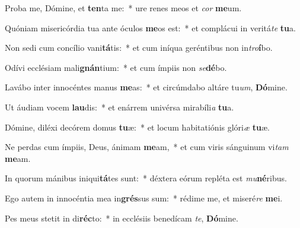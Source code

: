 \item Proba me, Dómine, et \textbf{ten}ta me:~* ure renes meos et \textit{cor} \textbf{me}um.
\item Quóniam misericórdia tua ante óculos \textbf{me}os est:~* et complácui in veritá\textit{te} \textbf{tu}a.
\item Non sedi cum concílio vani\textbf{tá}tis:~* et cum iníqua geréntibus non in\textit{tro}\textbf{í}bo.
\item Odívi ecclésiam mali\textbf{gnán}tium:~* et cum ímpiis non \textit{se}\textbf{dé}bo.
\item Lavábo inter innocéntes manus \textbf{me}as:~* et circúmdabo altáre tu\textit{um}, \textbf{Dó}mine.
\item Ut áudiam vocem \textbf{lau}dis:~* et enárrem univérsa mirabíli\textit{a} \textbf{tu}a.
\item Dómine, diléxi decórem domus \textbf{tu}æ:~* et locum habitatiónis glóri\textit{æ} \textbf{tu}æ.
\item Ne perdas cum ímpiis, Deus, ánimam \textbf{me}am,~* et cum viris sánguinum vi\textit{tam} \textbf{me}am.
\item In quorum mánibus iniqui\textbf{tá}tes sunt:~* déxtera eórum repléta est \textit{mu}\textbf{né}ribus.
\item Ego autem in innocéntia mea in\textbf{grés}sus sum:~* rédime me, et miseré\textit{re} \textbf{me}i.
\item Pes meus stetit in di\textbf{réc}to:~* in ecclésiis benedícam \textit{te}, \textbf{Dó}mine.

